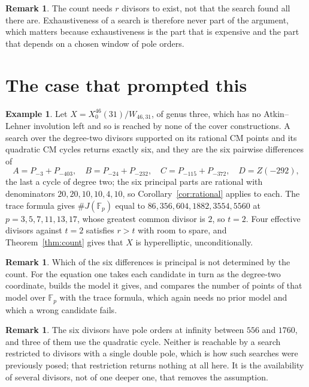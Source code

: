 \documentclass[11pt,reqno]{amsart}
\theoremstyle{plain}
\theoremstyle{definition}
\newtheorem{remark}[theorem]{Remark}
\newtheorem{example}[theorem]{Example}
\begin{document}
\begin{remark}\label{rem:exhaust}
The count needs $r$ divisors to exist, not that the search found all there are. Exhaustiveness of a
search is therefore never part of the argument, which matters because exhaustiveness is the part
that is expensive and the part that depends on a chosen window of pole orders.
\end{remark}

\section{The case that prompted this}

\begin{example}
Let $X = X_0^{46}(31)/W_{46,31}$, of genus three, which has no Atkin--Lehner involution left and so
is reached by none of the cover constructions. A search over the degree-two divisors supported on
its rational CM points and its quadratic CM cycles returns exactly six, and they are the six
pairwise differences of
\[
  A = P_{-3} + P_{-403}, \quad B = P_{-24} + P_{-232}, \quad C = P_{-115} + P_{-372}, \quad
  D = Z(-292),
\]
the last a cycle of degree two; the six principal parts are rational with denominators $20, 20,
10, 10, 4, 10$, so Corollary~\ref{cor:rational} applies to each. The trace
formula gives $\#J(\mathbb{F}_p)$ equal to $86, 356, 604, 1882, 3554, 5560$ at
$p = 3, 5, 7, 11, 13, 17$, whose greatest common divisor is $2$, so $t = 2$. Four effective
divisors against $t = 2$ satisfies $r > t$ with room to spare, and Theorem~\ref{thm:count} gives
that $X$ is hyperelliptic, unconditionally.
\end{example}

\begin{remark}\label{rem:which}
Which of the six differences is principal is not determined by the count. For the equation one
takes each candidate in turn as the degree-two coordinate, builds the model it gives, and compares
the number of points of that model over $\mathbb{F}_p$ with the trace formula, which again needs no
prior model and which a wrong candidate fails.
\end{remark}

\begin{remark}
The six divisors have pole orders at infinity between $556$ and $1760$, and three of them use the
quadratic cycle. Neither is reachable by a search restricted to divisors with a single double pole,
which is how such searches were previously posed; that restriction returns nothing at all here. It
is the availability of several divisors, not of one deeper one, that removes the assumption.
\end{remark}
\end{document}
